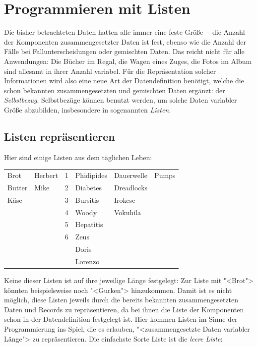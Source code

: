 
\chapter{Programmieren mit Listen}
\label{cha:rek}

Die bisher betrachteten Daten hatten alle immer eine feste Größe~--
die Anzahl der Komponenten zusammengesetzter Daten ist fest, ebenso wie die
Anzahl der Fälle bei Fallunterscheidungen oder gemischten Daten.  Das
reicht nicht für alle Anwendungen: Die Bücher im Regal, die Wagen
eines Zuges, die Fotos im Album sind allesamt in ihrer Anzahl
variabel.  Für die Repräsentation solcher Informationen wird also eine
neue Art der Datendefinition benötigt, welche die schon bekannten
zusammengesetzten und gemischten Daten ergänzt: der
\textit{Selbstbezug}.  Selbstbezüge können benutzt werden, um solche
Daten variabler Größe abzubilden, insbesondere in sogenannten
\textit{Listen}.

\section{Listen repräsentieren}
\label{sec:lists}

Hier sind einige Listen aus dem täglichen Leben:
%
\begin{center}
  \begin{tabular}{l@{\qquad}l@{\qquad}l@{\qquad}l@{\qquad}l@{\qquad}l}
  Brot & Herbert & 1 & Phidipides & Dauerwelle & Pumps \\
  Butter & Mike & 2 & Diabetes & Dreadlocks \\
  Käse & & 3 & Bursitis & Irokese \\
  & & 4 & Woody & Vokuhila \\
  && 5 & Hepatitis \\
  && 6 & Zeus \\
  &&& Doris\\
  &&& Lorenzo
\end{tabular}
\end{center}
%
Keine dieser Listen ist auf ihre jeweilige Länge festgelegt: Zur Liste
mit "<Brot"> könnten beispielsweise noch "<Gurken"> hinzukommen.  Damit ist es
nicht möglich, diese Listen jeweils durch die bereits bekannten
zusammengesetzten Daten und Records zu repräsentieren, da bei ihnen
die Liste der Komponenten schon in der Datendefinition festgelegt
ist.  Hier kommen Listen im Sinne der Programmierung ins Spiel, die es
erlauben, "<zusammengesetzte Daten variabler Länge"> zu
repräsentieren.  Die einfachste Sorte Liste ist die \textit{leere Liste}:

